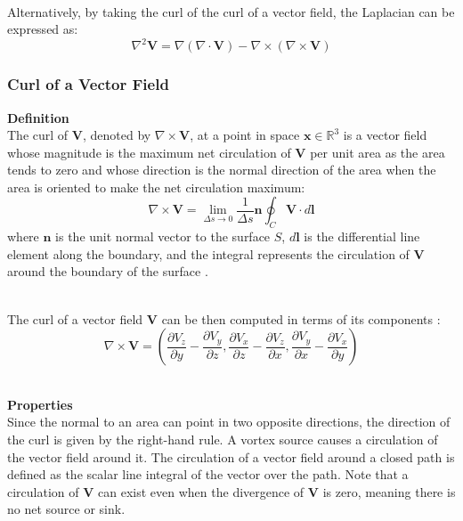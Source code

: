 \documentclass[main]{subfiles}
\begin{document}
\noindent\\
Alternatively, by taking the curl of the curl of a vector field, the Laplacian 
can be expressed as:
\begin{equation}
   \nabla^2 \mathbf{V} = \nabla (\nabla \cdot \mathbf{V}) - \nabla \times 
 (\nabla \times \mathbf{V})
   \label{eq:laplacian}
\end{equation}

\subsubsection{Curl of a Vector Field}
\textbf{Definition}\noindent\\
The curl of \(\mathbf{V}\), denoted by \(\nabla \times \mathbf{V}\), at a point in 
space \(\mathbf{x} \in \mathbb{R}^3\) is a vector field whose magnitude is the 
maximum net circulation of \(\mathbf{V}\) per unit area as the area tends to zero 
and whose direction is the normal direction of the area when the area is oriented 
to make the net circulation maximum:
\begin{equation}
\nabla \times \mathbf{V} = \lim_{\Delta s \to 0} \frac{1}{\Delta s} \mathbf{n} 
\oint_{C} \mathbf{V} \cdot d\mathbf{l}
\label{eq:curl}
\end{equation}
where \(\mathbf{n}\) is the unit normal vector to the surface \(S\), \(d\mathbf{l}\) 
is the differential line element along the boundary, and the integral represents 
the circulation of \(\mathbf{V}\) around the boundary of the surface 
\cite{book-magnetism}.

\noindent\\
The curl of a vector field \(\mathbf{V}\) can be then computed in terms of its 
components \cite{math-book}:
\begin{equation}
\nabla \times \mathbf{V} = \left( \frac{\partial V_z}{\partial y} - \frac{\partial 
V_y}{\partial z}, \frac{\partial V_x}{\partial z} - \frac{\partial V_z}{\partial 
x}, \frac{\partial V_y}{\partial x} - \frac{\partial V_x}{\partial y} \right)
\label{eq:curl_calculation}
\end{equation}

\noindent\\
\textbf{Properties}\noindent\\
Since the normal to an area can point in two opposite directions, the direction 
of the curl is given by the right-hand rule.
A vortex source causes a circulation of the vector field around it. The 
circulation of a vector field around a closed path is defined as the scalar line 
integral of the vector over the path. Note that a circulation of \(\mathbf{V}\) 
can exist even when the divergence of \(\mathbf{V}\) is zero, meaning there is no 
net source or sink.
\end{document}
